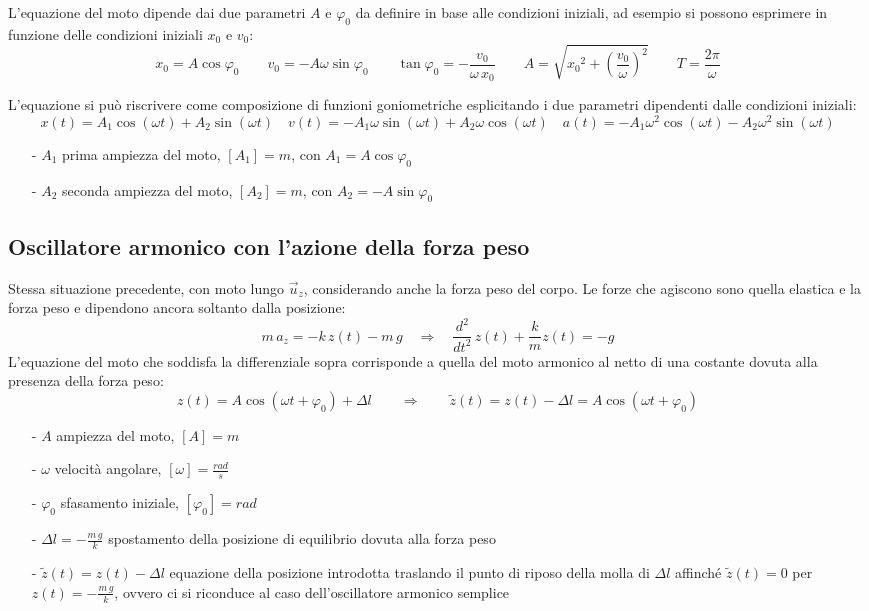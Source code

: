 \documentclass[a4paper]{article}
\newcommand\uz{\vec{u}_z}
\newcommand\dts{\frac{d^2}{dt^2}\,}
\begin{document}
L'equazione del moto dipende dai due parametri \(A\) e \(\varphi_0\) da definire in base alle condizioni iniziali, ad esempio
si possono esprimere in funzione delle condizioni iniziali \(x_0\) e \(v_0\):
\[x_0 = A \cos \varphi_0 \qquad v_0 = -A \omega \sin \varphi_0 \qquad \tan \varphi_0 = -\frac{v_0}{\omega \, x_0} \qquad A = \sqrt{{x_0}^2 + \left(\frac{v_0}{\omega}\right)^2} \qquad T = \frac{2\pi}{\omega}\]

L'equazione si può riscrivere come composizione di funzioni goniometriche esplicitando i due parametri dipendenti dalle condizioni iniziali:
\[x(t) = A_1 \cos (\omega t) + A_2 \sin (\omega t) \quad v(t) = -A_1 \omega \sin (\omega t) + A_2 \omega \cos (\omega t) \quad a(t) = -A_1 \omega^2 \cos (\omega t) - A_2 \omega^2 \sin (\omega t)\]
\begin{itemize}[topsep=3pt, itemsep=0pt]
	\item[-] \(A_1\) prima ampiezza del moto, \(\left[A_1\right] = m\), con \(A_1 = A \cos \varphi_0\)
	\item[-] \(A_2\) seconda ampiezza del moto, \(\left[A_2\right] = m\), con \(A_2 = -A \sin \varphi_0\)
\end{itemize}

\subsection{Oscillatore armonico con l'azione della forza peso}
Stessa situazione precedente, con moto lungo \(\uz\), considerando anche la forza peso del corpo. Le forze che agiscono sono
quella elastica e la forza peso e dipendono ancora soltanto dalla posizione:
\[m \, a_z = -k \, z(t) - m \, g \quad \Rightarrow \quad \dts z(t) + \frac{k}{m} z(t) = -g\]
L'equazione del moto che soddisfa la differenziale sopra corrisponde a quella del moto armonico al netto di una costante
dovuta alla presenza della forza peso:
\[z(t) = A \cos (\omega t + \varphi_0) + \Delta l \qquad \Rightarrow \qquad \tilde{z}(t) = z(t) - \Delta l = A \cos (\omega t + \varphi_0)\]
\begin{itemize}[topsep=3pt, itemsep=0pt]
	\item[-] \(A\) ampiezza del moto, \(\left[A\right] = m\)
	\item[-] \(\omega\) velocità angolare, \(\left[\omega\right] = \frac{rad}{s}\)
	\item[-] \(\varphi_0\) sfasamento iniziale, \(\left[\varphi_0\right] = rad\)
	\item[-] \(\displaystyle \Delta l = - \frac{m \, g}{k}\) spostamento della posizione di equilibrio dovuta alla forza peso
	\item[-] \(\tilde{z}(t) = z(t) - \Delta l\) equazione della posizione introdotta traslando il punto di riposo della molla di \(\Delta l\) affinché
	\(\tilde{z}(t) = 0\) per \(\displaystyle z(t) = -\frac{m \, g}{k}\), ovvero ci si riconduce al caso dell'oscillatore armonico semplice
\end{itemize}
\end{document}
